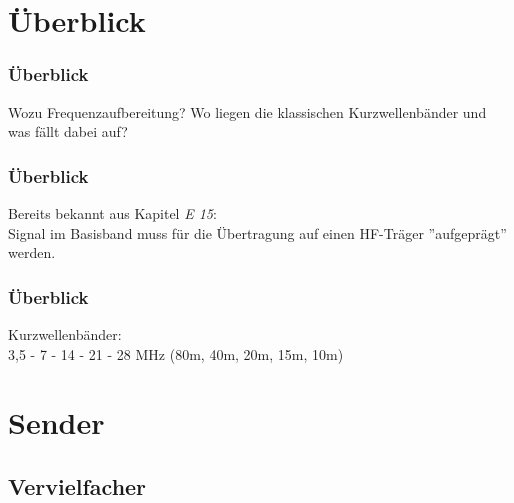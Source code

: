 

\subtitle{Technik Klasse A 13: \\
          Frequenzaufbereitung \\[2em]}
\date{Stand 18.06.2015}




\section{Überblick}

\begin{frame}
    \frametitle{Überblick}

    Wozu Frequenzaufbereitung? Wo liegen die klassischen Kurzwellenbänder und
    was fällt dabei auf?

\end{frame}

\begin{frame}
    \frametitle{Überblick}

    Bereits bekannt aus Kapitel \emph{E 15}: \\[2em]

    Signal im Basisband muss für die Übertragung auf einen HF-Träger
    ''aufgeprägt'' werden.

\end{frame}

\begin{frame}
    \frametitle{Überblick}

    Kurzwellenbänder: \\[2em]

    3,5 - 7 - 14 - 21 - 28 MHz (80m, 40m, 20m, 15m, 10m)

\end{frame}

\section{Sender}

\subsection{Vervielfacher}

